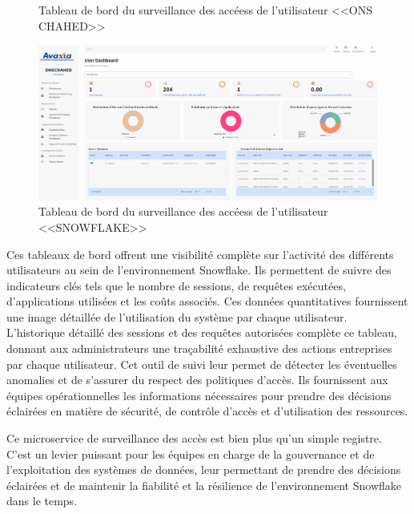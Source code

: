 \begin{itemize}
\begin{figure}[H]
                \caption{Tableau de bord du surveillance des accéess de l'utilisateur <<ONS CHAHED>>}
                    \label{fig:acess1}
                \end{figure}
                \begin{figure}[H]
                    \centering
                    \includegraphics[width =1\linewidth]{img/captures/user/2.png}
                    \caption{Tableau de bord du surveillance des accéess de l'utilisateur <<SNOWFLAKE>>}
                        \label{fig:acess1}
                    \end{figure}
                \par Ces tableaux de bord offrent une visibilité complète sur l'activité des différents utilisateurs au sein de l'environnement Snowflake. Ils permettent de suivre des indicateurs clés tels que le nombre de sessions, de requêtes exécutées, d'applications utilisées et les coûts associés. Ces données quantitatives fournissent une image détaillée de l'utilisation du système par chaque utilisateur.
                \\ L'historique détaillé des sessions et des requêtes autorisées complète ce tableau, donnant aux administrateurs une traçabilité exhaustive des actions entreprises par chaque utilisateur. Cet outil de suivi leur permet de détecter les éventuelles anomalies et de s'assurer du respect des politiques d'accès.
                Ils fournissent aux équipes opérationnelles les informations nécessaires pour prendre des décisions éclairées en matière de sécurité, de contrôle d'accès et d'utilisation des ressources.
\end{itemize}
\par Ce microservice de surveillance des accès est bien plus qu'un simple registre. C'est un levier puissant pour les équipes en charge de la gouvernance et de l'exploitation des systèmes de données, leur permettant de prendre des décisions éclairées et de maintenir la fiabilité et la résilience de l'environnement Snowflake dans le temps.
